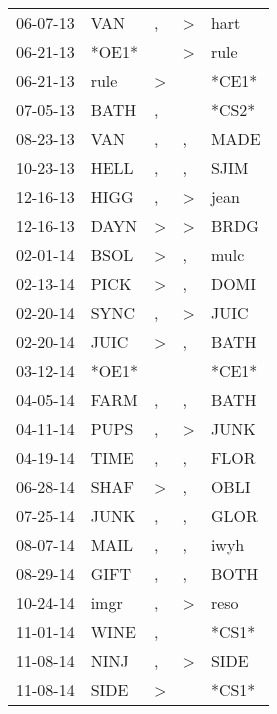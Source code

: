 \begin{supertabular}{lllll}
 06-07-13 &    VAN &                , &     \textgreater &   hart \\
 06-21-13 &  *OE1* &                  &     \textgreater &   rule \\
 06-21-13 &   rule &     \textgreater &                  &  *CE1* \\
 07-05-13 &   BATH &                , &                  &  *CS2* \\
 08-23-13 &    VAN &                , &                , &   MADE \\
 10-23-13 &   HELL &                , &                , &   SJIM \\
 12-16-13 &   HIGG &                , &     \textgreater &   jean \\
 12-16-13 &   DAYN &     \textgreater &     \textgreater &   BRDG \\
 02-01-14 &   BSOL &     \textgreater &                , &   mulc \\
 02-13-14 &   PICK &     \textgreater &                , &   DOMI \\
 02-20-14 &   SYNC &                , &     \textgreater &   JUIC \\
 02-20-14 &   JUIC &     \textgreater &                , &   BATH \\
 03-12-14 &  *OE1* &                  &                  &  *CE1* \\
 04-05-14 &   FARM &                , &                , &   BATH \\
 04-11-14 &   PUPS &                , &     \textgreater &   JUNK \\
 04-19-14 &   TIME &                , &                , &   FLOR \\
 06-28-14 &   SHAF &     \textgreater &                , &   OBLI \\
 07-25-14 &   JUNK &                , &                , &   GLOR \\
 08-07-14 &   MAIL &                , &                , &   iwyh \\
 08-29-14 &   GIFT &                , &                , &   BOTH \\
 10-24-14 &   imgr &                , &     \textgreater &   reso \\
 11-01-14 &   WINE &                , &                  &  *CS1* \\
 11-08-14 &   NINJ &                , &     \textgreater &   SIDE \\
 11-08-14 &   SIDE &     \textgreater &                  &  *CS1* \\

\end{supertabular}
